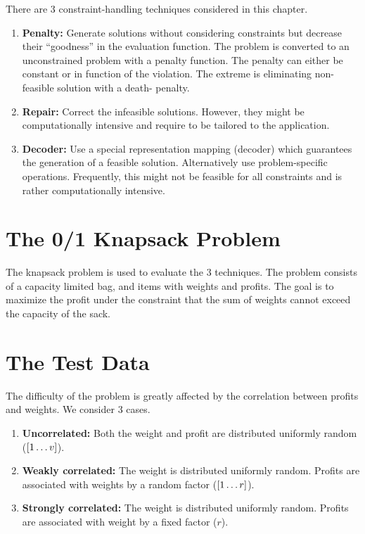 \documentclass[../main.tex]{subfiles}
\begin{document}
\begin{mdframed}
\end{mdframed}

There are 3 constraint-handling techniques considered in this chapter.

\begin{enumerate}
	\item \textbf{Penalty:} Generate solutions without considering constraints but decrease their ``goodness'' in the
	evaluation function. The problem is converted to an unconstrained problem with a penalty function. The penalty can
	either be constant or in function of the violation. The extreme is eliminating non-feasible solution with a death-
	penalty.
	\item \textbf{Repair:} Correct the infeasible solutions. However, they might be computationally intensive and
	require to be tailored to the application.
	\item \textbf{Decoder:} Use a special representation mapping (decoder) which guarantees the generation of a
	feasible solution. Alternatively use problem-specific operations. Frequently, this might not be feasible for all
	constraints and is rather computationally intensive.
\end{enumerate}

\section{The 0/1 Knapsack Problem}

The knapsack problem is used to evaluate the 3 techniques. The problem consists of a capacity limited bag, and items
with weights and profits. The goal is to maximize the profit under the constraint that the sum of weights cannot exceed
the capacity of the sack.

\section{The Test Data}

The difficulty of the problem is greatly affected by the correlation between profits and weights. We consider 3 cases.

\begin{enumerate}
	\item \textbf{Uncorrelated:} Both the weight and profit are distributed uniformly random ($[1 \mathellipsis v]$).
	\item \textbf{Weakly correlated:} The weight is distributed uniformly random. Profits are associated with weights
	by a random factor ($[1 \mathellipsis r]$).
	\item \textbf{Strongly correlated:} The weight is distributed uniformly random. Profits are associated with weight
	by a fixed factor ($r$).
\end{enumerate}
\end{document}
